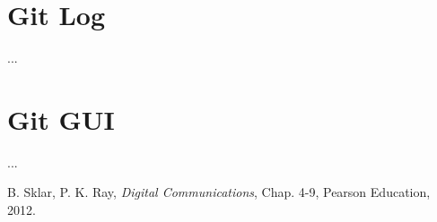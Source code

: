 \documentclass[a4paper,portrait,10pt]{article}   %
\begin{document}

\section{Git Log}   \label{sec:GitLog}
...


\section{Git GUI}   \label{sec:GitGui}
...
  

\begin{thebibliography}{99} %

 B. Sklar, P. K. Ray, \textit{Digital Communications}, Chap. 4-9, Pearson Education, 2012.
 
\end{thebibliography}







\end{document}
